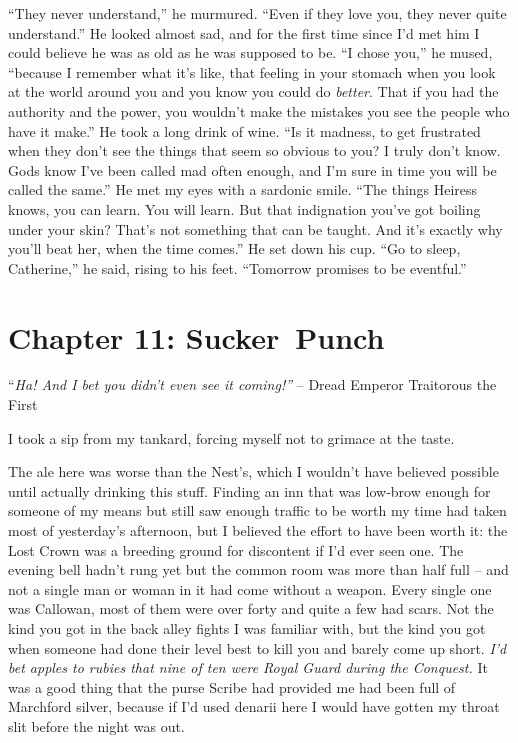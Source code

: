 \documentclass[12pt, openany]{book}
\begin{document}
“They never understand,” he murmured. “Even if they love you, they never quite understand.”
He looked almost sad, and for the first time since I’d met him I could believe he was as old as he was supposed to be.
“I chose you,” he mused, “because I remember what it’s like, that feeling in your stomach when you look at the world around you and you know you could do \textit{better}. That if you had the authority and the power, you wouldn’t make the mistakes you see the people who have it make.”
He took a long drink of wine.
“Is it madness, to get frustrated when they don’t see the things that seem so obvious to you? I truly don’t know. Gods know I’ve been called mad often enough, and I’m sure in time you will be called the same.”
He met my eyes with a sardonic smile.
“The things Heiress knows, you can learn. You will learn. But that indignation you’ve got boiling under your skin? That’s not something that can be taught. And it’s exactly why you’ll beat her, when the time comes.”
He set down his cup.
“Go to sleep, Catherine,” he said, rising to his feet. “Tomorrow promises to be eventful.”
\clearpage
\chapter{Chapter 11: Sucker Punch}

“\textit{Ha! And I bet you didn’t even see it coming!”}
– Dread Emperor Traitorous the First

I took a sip from my tankard, forcing myself not to grimace at the taste.

The ale here was worse than the Nest’s, which I wouldn’t have believed possible until actually drinking this stuff. Finding an inn that was low-brow enough for someone of my means but still saw enough traffic to be worth my time had taken most of yesterday’s afternoon, but I believed the effort to have been worth it: the Lost Crown was a breeding ground for discontent if I’d ever seen one. The evening bell hadn’t rung yet but the common room was more than half full – and not a single man or woman in it had come without a weapon. Every single one was Callowan, most of them were over forty and quite a few had scars. Not the kind you got in the back alley fights I was familiar with, but the kind you got when someone had done their level best to kill you and barely come up short. \textit{I’d bet apples to rubies that nine of ten were Royal Guard during the Conquest.} It was a good thing that the purse Scribe had provided me had been full of Marchford silver, because if I’d used denarii here I would have gotten my throat slit before the night was out. 
\end{document}

